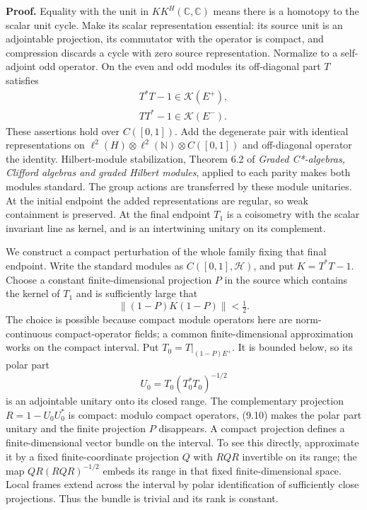 \documentclass[
  11pt,
]{article}
\begin{document}
\textbf{Proof.} Equality with the unit in \(KK^H(\mathbb C,\mathbb C)\)
means there is a homotopy to the scalar unit cycle. Make its scalar
representation essential: its source unit is an adjointable projection,
its commutator with the operator is compact, and compression discards a
cycle with zero source representation. Normalize to a self-adjoint odd
operator. On the even and odd modules its off-diagonal part \(T\)
satisfies \[
\begin{gathered}
T^*T-1\in\mathcal K(E^+),\\
TT^*-1\in\mathcal K(E^-).
\end{gathered}
\tag{9.10}
\] These assertions hold over \(C([0,1])\). Add the degenerate pair with
identical representations on
\(\ell^2(H)\otimes\ell^2(\mathbb N)\otimes C([0,1])\) and off-diagonal
operator the identity. Hilbert-module stabilization, Theorem 6.2 of
\emph{Graded C*-algebras, Clifford algebras and graded Hilbert modules},
applied to each parity makes both modules standard. The group actions
are transferred by these module unitaries. At the initial endpoint the
added representations are regular, so weak containment is preserved. At
the final endpoint \(T_1\) is a coisometry with the scalar invariant
line as kernel, and is an intertwining unitary on its complement.

We construct a compact perturbation of the whole family fixing that
final endpoint. Write the standard modules as \(C([0,1],\mathcal H)\),
and put \(K=T^*T-1\). Choose a constant finite-dimensional projection
\(P\) in the source which contains the kernel of \(T_1\) and is
sufficiently large that \[
\|(1-P)K(1-P)\|<\tfrac12.
\tag{9.11}
\] The choice is possible because compact module operators here are
norm-continuous compact-operator fields; a common finite-dimensional
approximation works on the compact interval. Put \(T_0=T|_{(1-P)E^+}\).
It is bounded below, so its polar part \[
U_0=T_0(T_0^*T_0)^{-1/2}
\tag{9.12}
\] is an adjointable unitary onto its closed range. The complementary
projection \(R=1-U_0U_0^*\) is compact: modulo compact operators, (9.10)
makes the polar part unitary and the finite projection \(P\) disappears.
A compact projection defines a finite-dimensional vector bundle on the
interval. To see this directly, approximate it by a fixed
finite-coordinate projection \(Q\) with \(RQR\) invertible on its range;
the map \(QR(RQR)^{-1/2}\) embeds its range in that fixed
finite-dimensional space. Local frames extend across the interval by
polar identification of sufficiently close projections. Thus the bundle
is trivial and its rank is constant.
\end{document}
